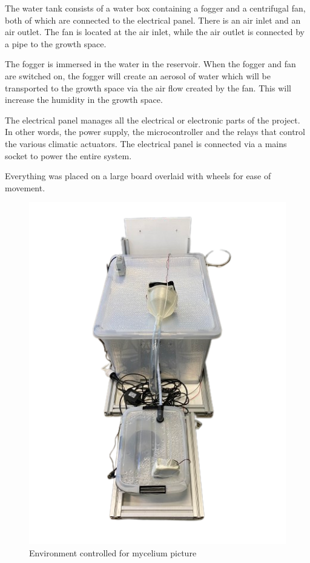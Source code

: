 The water tank consists of a water box containing a fogger and a centrifugal fan, both of which are connected to the electrical panel. There is an air inlet and an air outlet. The fan is located at the air inlet, while the air outlet is connected by a pipe to the growth space.

The fogger is immersed in the water in the reservoir. When the fogger and fan are switched on, the fogger will create an aerosol of water which will be transported to the growth space via the air flow created by the fan. This will increase the humidity in the growth space.

The electrical panel manages all the electrical or electronic parts of the project. In other words, the power supply, the microcontroller and the relays that control the various climatic actuators. The electrical panel is connected via a mains socket to power the entire system.

Everything was placed on a large board overlaid with wheels for ease of movement. 

\begin{figure}[h]
    \centering
    \includegraphics{images/myceliummachine.png}
    \caption{Environment controlled for mycelium picture}
    \label{fig:Mycemachinne}
\end{figure} 



